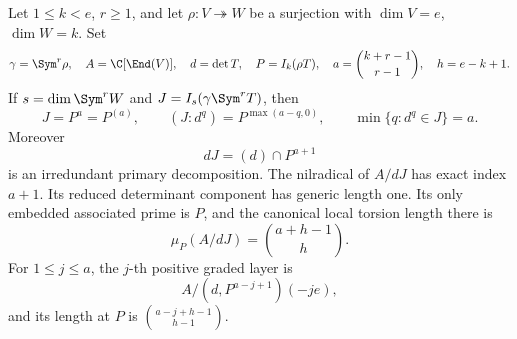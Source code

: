\begin{theorem}
\label{thm:quotient-induced-primary-law}
Let \(1\le k<e\), \(r\ge1\), and let \(\rho:V\twoheadrightarrow W\)
be a surjection with \(\dim V=e\), \(\dim W=k\).  Set
\[
 \gamma=\Sym^r\rho,\quad
 A=\C[\End(V)],\quad d=\det T,\quad P=I_k(\rho T),
 \quad a=\binom{k+r-1}{r-1},\quad h=e-k+1.
\]
If \(s=\dim\Sym^rW\) and
\(J=I_s(\gamma\Sym^rT)\), then
\[
 J=P^a=P^{(a)},\qquad
 (J:d^q)=P^{\max(a-q,0)},\qquad
 \min\{q:d^q\in J\}=a.
\]
Moreover
\begin{equation}\label{eq:quotient-induced-decomposition}
 dJ=(d)\cap P^{a+1}
\end{equation}
is an irredundant primary decomposition.  The nilradical of
\(A/dJ\) has exact index \(a+1\).  Its reduced determinant component
has generic length one.  Its only embedded associated prime is \(P\),
and the canonical local torsion length there is
\[
 \mu_P(A/dJ)=\binom{a+h-1}{h}.
\]
For \(1\le j\le a\), the \(j\)-th positive graded layer is
\[
 A/(d,P^{a-j+1})(-je),
\]
and its length at \(P\) is
\(\binom{a-j+h-1}{h-1}\).
\end{theorem}
